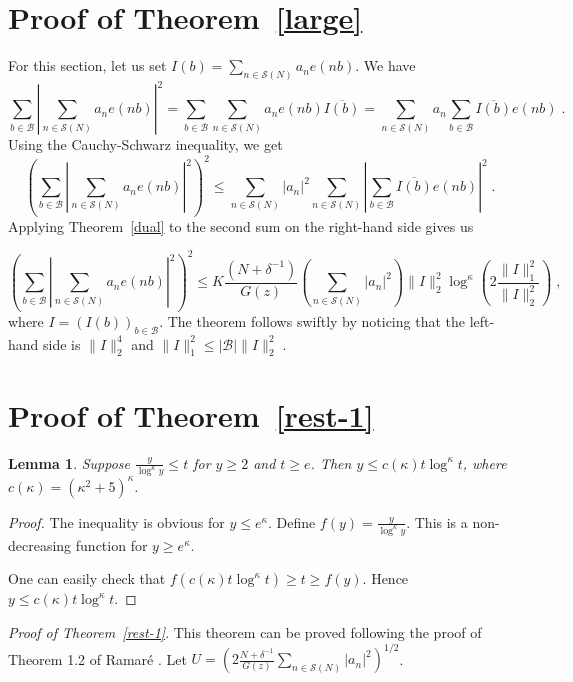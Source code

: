 \documentclass[12pt,article]{amsart}
\newtheorem{lemma}[theorem]{Lemma}
\theoremstyle{remark}
\numberwithin{equation}{section}
\begin{document}
	\section{Proof of Theorem~\ref{large}}
	\label{proof-large}
	\noindent
	For this section, let us set $I(b)=\sum_{n\in \mathcal{S}(N)}a_ne(nb)$.
	We have
	\[
	\sum_{b\in \mathcal{B}}\left|\sum_{n\in \mathcal{S}(N)}a_ne(nb)\right|^2= \sum_{b\in \mathcal{B}}\sum_{n\in \mathcal{S}(N)}a_ne(nb)\overline{I(b)}= \sum_{n\in \mathcal{S}(N)}a_n\sum_{b\in \mathcal{B}}\overline{I(b)}e(nb)\; .
	\]
	Using the Cauchy-Schwarz inequality, we get
	\[
	\left(\sum_{b\in \mathcal{B}}\left|\sum_{n\in \mathcal{S}(N)}a_ne(nb)\right|^2\right)^2\leq \sum_{n\in \mathcal{S}(N)}|a_n|^2\sum_{n\in \mathcal{S}(N)}\left|\sum_{b\in \mathcal{B}}\overline{{I}(b)}e(nb)\right|^2\; .
	\]
	Applying Theorem~\ref{dual} to the second sum on the right-hand side gives us
	
	\[
	\left(\sum_{b\in \mathcal{B}}\left|\sum_{n\in \mathcal{S}(N)}a_ne(nb)\right|^2\right)^2\leq K \frac{(N+\delta^{-1})}{G(z)} \left(\sum_{n\in \mathcal{S}(N)}|a_n|^2\right)  \|I\|_2^2 \log^\kappa\left(2\frac{\|I\|_1^2}{\|I\|_2^2}\right)   \;,
	\]
	where $I=(I(b))_{b\in \mathcal{B}}.$ The theorem follows swiftly by noticing that the left-hand side is $\|I\|_2^4$ and $\|I\|_1^2\leq |\mathcal{B}|\|I\|_2^2\;.$ 
	
	
	\section{Proof of Theorem~\ref{rest-1}}
	\label{proof-1.2}
	\begin{lemma}
		\label{y-to-t}
		Suppose  $\frac{y}{\log^\kappa y}\leq t$ for $y\geq 2$ and $t\geq e$. Then $y\leq c(\kappa)t\log^\kappa t$, where $c(\kappa)=(\kappa^2+5)^{\kappa}$.
	\end{lemma}
	\begin{proof}
		The inequality is obvious for $y\leq e^{\kappa}$. 
		Define $f(y)=\frac{y}{\log^\kappa y}$. This is a non-decreasing function for $y\geq e^{\kappa}$. 
		
		\vspace{2mm}
		\noindent
		One can easily check that $f(c(\kappa)t\log^\kappa t)\geq t\geq f(y)$. Hence $y\leq c(\kappa)t\log^\kappa t$.
	\end{proof}
	
	\noindent 
	{\em{Proof of Theorem~\ref{rest-1}}}. 
	This theorem can be proved following the proof of Theorem 1.2 of Ramar\'e \cite{ramare24}. 
	Let $U=\left(2\frac{N+\delta^{-1}}{G(z)}\sum_{n\in \mathcal{S}(N)}|a_n|^2\right)^{1/2}$. 
	
\end{document}
